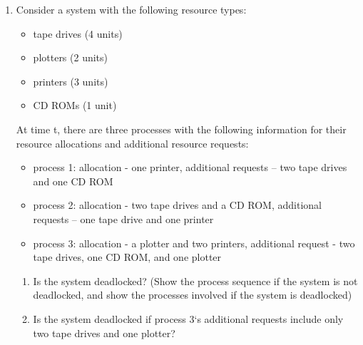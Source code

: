 \documentclass{article}
\begin{document}
\begin{enumerate}
\begin{table*}[h]
\begin{tabular}{c}
				\begin{tabular}{lcccc}
					A & B & C & D \\\hline
					1 & 5 & 2 & 0 \\
				\end{tabular}
			\end{tabular}
		\end{table*}
		\begin{enumerate}
			\item What is the content of matrix Need?
			\item Is the system in a safe state?
			\item If a request from process P1 arrives for (0, 4, 2, 0), can the request be granted immediately?
		\end{enumerate}
		\item Consider a system with the following resource types:
		\begin{itemize}
			\item tape drives (4 units)
			\item plotters (2 units)
			\item printers (3 units)
			\item CD ROMs (1 unit)
		\end{itemize}
		At time t, there are three processes with the following information for their resource allocations and additional resource requests:
		\begin{itemize}
			\item process 1: allocation - one printer, additional requests – two tape drives and one CD ROM
			\item process 2: allocation - two tape drives and a CD ROM, additional requests – one tape drive and one printer
			\item process 3: allocation - a plotter and two printers, additional request - two tape drives, one CD ROM, and one plotter
		\end{itemize}
		\begin{enumerate}
			\item Is the system deadlocked? (Show the process sequence if the system is not deadlocked, and show the processes involved if the system is deadlocked)
			\item Is the system deadlocked if process 3‘s additional requests include only two tape drives and one plotter?
		\end{enumerate}
	\end{enumerate}
\end{document}

